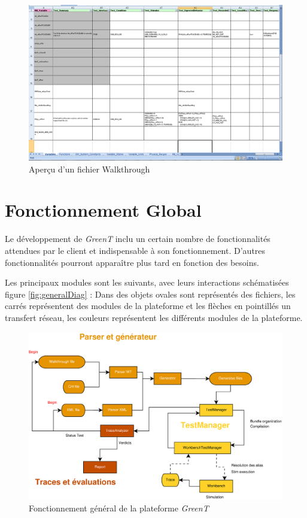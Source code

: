 		\begin{figure}[H]
			\centering
			\includegraphics[width=18.5cm]{contents/images/walkthrough.png}
			\caption{Aperçu d'un fichier Walkthrough}
		\end{figure}
		\section{Fonctionnement Global}
	Le développement de \textit{GreenT} inclu un certain nombre de fonctionnalités attendues par le client et indispensable à son fonctionnement. D'autres fonctionnalités pourront apparaître plus tard en fonction des besoins.

	Les principaux modules sont les suivants, avec leurs interactions schématisées figure \ref{fig:generalDiag} : 
			Dans des objets ovales sont représentés des fichiers, les carrés représentent des modules de la plateforme et les flèches en pointillés un transfert réseau, les couleurs représentent les différents modules de la plateforme.

			\begin{figure}[H]
			\centering
			\includegraphics[width=16.5cm]{contents/images/generalDiag.eps}
			\caption{Fonctionnement général de la plateforme \textit{GreenT}}
			\label{fig:generalDig}
		\end{figure}	

